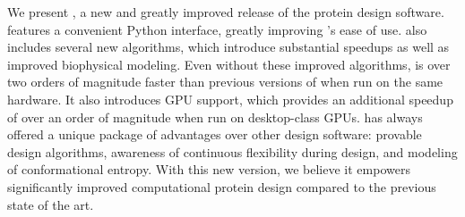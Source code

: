 We present , a new and greatly improved release of the \osprey protein design software.   features a convenient Python interface, greatly improving \osprey's ease of use.   also includes several new algorithms, which introduce substantial speedups as well as improved biophysical modeling.  Even without these improved algorithms,  is over two orders of magnitude faster than previous versions of \osprey when run on the same hardware.  It also introduces GPU support, which provides an additional speedup of over an order of magnitude when run on desktop-class GPUs.  \osprey has always offered a unique package of advantages over other design software: provable design algorithms, awareness of continuous flexibility during design, and modeling of conformational entropy.  With this new version, we believe it empowers significantly improved computational protein design compared to the previous state of the art.  
